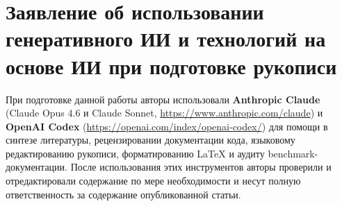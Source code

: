 \documentclass[a4paper,fleqn]{cas-sc}
\begin{document}
\section*{Заявление об использовании генеративного ИИ и технологий на основе ИИ при подготовке рукописи}

При подготовке данной работы авторы использовали \textbf{Anthropic Claude} (Claude Opus 4.6 и Claude Sonnet, \url{https://www.anthropic.com/claude}) и \textbf{OpenAI Codex} (\url{https://openai.com/index/openai-codex/}) для помощи в синтезе литературы, рецензировании документации кода, языковому редактированию рукописи, форматированию LaTeX и аудиту benchmark-документации. После использования этих инструментов авторы проверили и отредактировали содержание по мере необходимости и несут полную ответственность за содержание опубликованной статьи.

\printcredits



\end{document}
